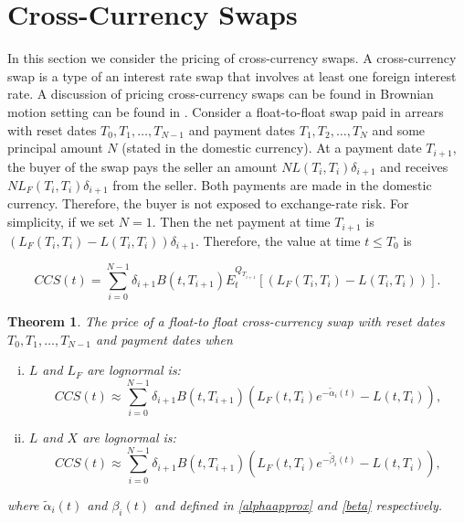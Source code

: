 \documentclass[11pt]{article}
\newtheorem{theorem}{Theorem}[section]
\begin{document}
\section{Cross-Currency Swaps}

In this section we consider the pricing of cross-currency swaps. A cross-currency swap is a type of an interest rate swap that involves at least one foreign interest rate. A discussion of pricing cross-currency swaps can be found in Brownian motion setting can be found in \cite{musiela}. Consider a float-to-float swap paid in arrears with reset dates $T_0,T_1,\dots,T_{N-1}$ and payment dates $T_1,T_2,\dots,T_N$ and some principal amount $N$ (stated in the domestic currency). At a payment date $T_{i+1}$, the buyer of the swap pays the seller an amount $NL(T_i,T_i)\delta_{i+1}$ and receives $NL_F(T_i,T_i)\delta_{i+1}$ from the seller. Both payments are made in the domestic currency. Therefore, the buyer is not exposed to exchange-rate risk. For simplicity, if we set $N=1$. Then the net payment at time $T_{i+1 }$ is $(L_F(T_i,T_i)-L(T_i,T_i))\delta_{i+1}$. Therefore, the value at time $t\leq T_0$ is

\begin{equation}
    CCS(t)=\sum_{i=0}^{N-1}\delta_{i+1}B(t,T_{i+1})E^{Q_{T_{i+1}}}_t\left[(L_F(T_i,T_i)-L(T_i,T_i))\right]. 
\end{equation}

\begin{theorem}

The price of a float-to float cross-currency swap with reset dates $T_0,T_1,\dots,T_{N-1}$ and payment dates when 

\begin{enumerate}[(i)]
    \item $L$ and $L_F$ are lognormal is:
     \begin{equation}
        CCS(t)\approx\sum_{i=0}^{N-1}\delta_{i+1}B(t,T_{i+1})(L_F(t,T_i)e^{-\tilde{\alpha}_i(t)}-L(t,T_i)),    
    \end{equation}
    
    \item $L$ and $X$ are lognormal is:
    \begin{equation}
        CCS(t)\approx\sum_{i=0}^{N-1}\delta_{i+1}B(t,T_{i+1})(L_F(t,T_i)e^{-\tilde{\beta}_i(t)}-L(t,T_i)),
    \end{equation}
\end{enumerate}
where $\tilde{\alpha}_i(t)$ and $\beta_i(t)$ and defined in \eqref{alphaapprox} and \eqref{beta} respectively.

\end{theorem}
\end{document}
